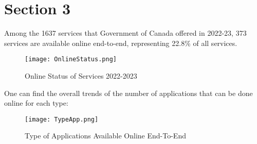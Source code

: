 \section{Section 3}

Among the 1637 services that Government of Canada offered in 2022-23, 373 services are available online end-to-end, representing 22.8\% of all services.
\begin{figure}
    \centering
    \texttt{[image: OnlineStatus.png]}
    \caption{\label{fig:OnlStat}Online Status of Services 2022-2023}
    \end{figure}

One can find the overall trends of the number of applications that can be done online for each type:

\begin{figure}
    \centering
    \texttt{[image: TypeApp.png]}
    \caption{\label{fig:TypeApp}Type of Applications Available Online End-To-End}
    \end{figure}
